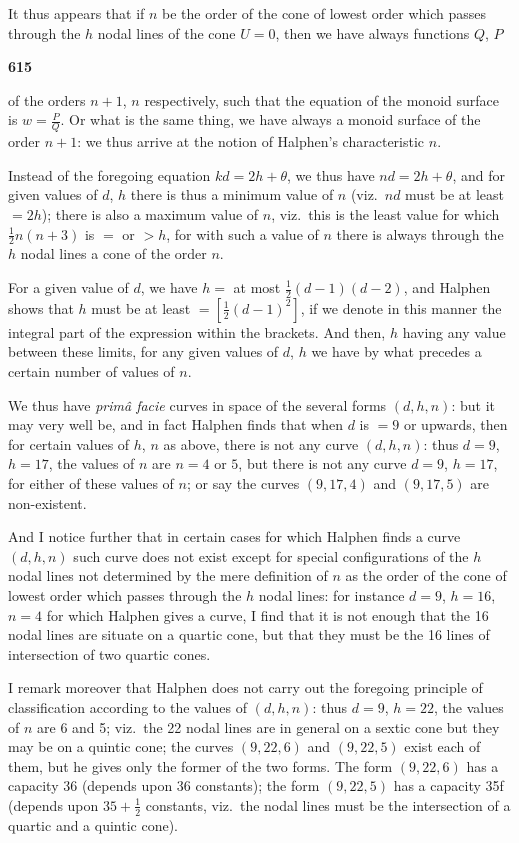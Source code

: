 \documentclass[12pt,a4paper]{article}
\theoremstyle{plain}
\begin{document}
It thus appears that if $n$ be the order of the cone of lowest order which passes through the $h$ nodal lines of the cone $U=0$, then we have always functions $Q$, $P$

\newpage
\noindent\textbf{615}

of the orders $n+1$, $n$ respectively, such that the equation of the monoid surface is $w=\frac{P}{Q}$. Or what is the same thing, we have always a monoid surface of the order $n+1$: we thus arrive at the notion of Halphen's characteristic $n$.

Instead of the foregoing equation $kd=2h+\theta$, we thus have $nd=2h+\theta$, and for given values of $d$, $h$ there is thus a minimum value of $n$ (viz.~$nd$ must be at least $=2h$); there is also a maximum value of $n$, viz.~this is the least value for which $\frac{1}{2}n(n+3)$ is $=$ or $>h$, for with such a value of $n$ there is always through the $h$ nodal lines a cone of the order $n$.

For a given value of $d$, we have $h=$ at most $\frac{1}{2}(d-1)(d-2)$, and Halphen shows that $h$ must be at least $=[\frac{1}{2}(d-1)^2]$, if we denote in this manner the integral part of the expression within the brackets. And then, $h$ having any value between these limits, for any given values of $d$, $h$ we have by what precedes a certain number of values of $n$.

We thus have \textit{prim\^{a} facie} curves in space of the several forms $(d,h,n)$: but it may very well be, and in fact Halphen finds that when $d$ is $=9$ or upwards, then for certain values of $h$, $n$ as above, there is not any curve $(d,h,n)$: thus $d=9$, $h=17$, the values of $n$ are $n=4$ or $5$, but there is not any curve $d=9$, $h=17$, for either of these values of $n$; or say the curves $(9,17,4)$ and $(9,17,5)$ are non-existent.

And I notice further that in certain cases for which Halphen finds a curve $(d,h,n)$ such curve does not exist except for special configurations of the $h$ nodal lines not determined by the mere definition of $n$ as the order of the cone of lowest order which passes through the $h$ nodal lines: for instance $d=9$, $h=16$, $n=4$ for which Halphen gives a curve, I find that it is not enough that the 16 nodal lines are situate on a quartic cone, but that they must be the 16 lines of intersection of two quartic cones.

I remark moreover that Halphen does not carry out the foregoing principle of classification according to the values of $(d,h,n)$: thus $d=9$, $h=22$, the values of $n$ are 6 and 5; viz.~the 22 nodal lines are in general on a sextic cone but they may be on a quintic cone; the curves $(9,22,6)$ and $(9,22,5)$ exist each of them, but he gives only the former of the two forms. The form $(9,22,6)$ has a capacity 36 (depends upon 36 constants); the form $(9,22,5)$ has a capacity 35f (depends upon $35+\frac{1}{2}$ constants, viz.~the nodal lines must be the intersection of a quartic and a quintic cone).
\end{document}
